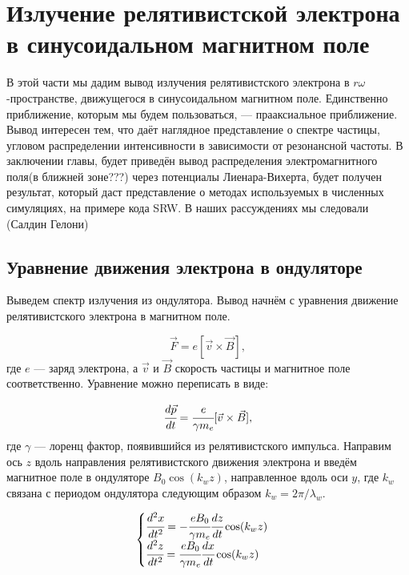 \documentclass[14pt,a4paper]{extarticle}
\numberwithin{equation}{section}
\begin{document}
\section{Излучение релятивистской электрона в синусоидальном магнитном поле}
В этой части мы дадим вывод излучения релятивистского электрона в $r\omega$-пространстве, движущегося в синусоидальном магнитном поле. Единственно приближение, которым мы будем пользоваться, --- прааксиальное приближение. Вывод интересен тем, что даёт наглядное представление о спектре частицы, угловом распределении интенсивности в зависимости от резонансной частоты. В заключении главы, будет приведён вывод распределения электромагнитного поля(в ближней зоне???) через потенциалы Лиенара-Вихерта, будет получен результат, который даст представление о методах используемых в численных симуляциях, на примере кода SRW. В наших рассуждениях мы следовали (Салдин Гелони)
\subsection{Уравнение движения электрона в ондуляторе}
Выведем спектр излучения из ондулятора. Вывод начнём с уравнения движение релятивистского электрона в магнитном поле.

\begin{equation}
	\vec{F} = e[\vec{v} \times \vec{B}],
\end{equation} 
где $e$ --- заряд электрона, а $\vec{v}$ и $\vec{B}$ скорость частицы и магнитное поле соответственно. Уравнение можно переписать в виде:

\begin{equation}
	\cfrac{d\vec{p}}{dt} = \cfrac{e}{\gamma m_e}[\vec{v} \times \vec{B}],
\end{equation}
где $\gamma$ --- лоренц фактор, появившийся из релятивистского импульса. Направим ось $z$ вдоль направления релятивистского движения электрона и введём магнитное поле в ондуляторе $B_0\cos(k_w z)$, направленное вдоль оси $y$, где $k_w$ связана с периодом ондулятора следующим образом $k_w = 2\pi/\lambda_w$. 

\begin{equation}
	\label{eq:eq_of_motion}
	\begin{cases}
		\cfrac{d^2 x}{dt^2} = - \cfrac{e B_0}{\gamma m_e}\cfrac{dz}{dt} \cos(k_w z)\\
		\cfrac{d^2 z}{dt^2} = \cfrac{e B_0}{\gamma m_e}\cfrac{dx}{dt} \cos(k_w z)
	\end{cases} 
\end{equation}
\end{document}
